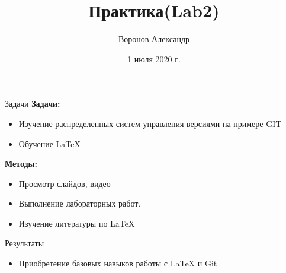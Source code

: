 \documentclass{beamer}
\begin{document}
\title {Практика(Lab2)}  
\author {Воронов Александр} 	
\date{1 июля 2020 г.}
\begin{frame}
		\titlepage
\end{frame}
	
\begin{frame}{Задачи}
	\textbf{Задачи:}
	\begin{itemize}
		\item Изучение распределенных систем управления версиями на примере GIT
		\item Обучение LaTeX
	\end{itemize}
\textbf{Методы:}
\begin{itemize}
	\item Просмотр слайдов, видео
	\item Выполнение лабораторных работ.
	\item Изучение литературы по LaTeX

\end{itemize}
\end{frame}
	\begin{frame}{Результаты}
		\begin{itemize}
			\item Приобретение базовых навыков работы с LaTeX и Git
		\end{itemize}
	\end{frame}	
\begin{frame}
	\titlepage
\end{frame}
\end{document}
